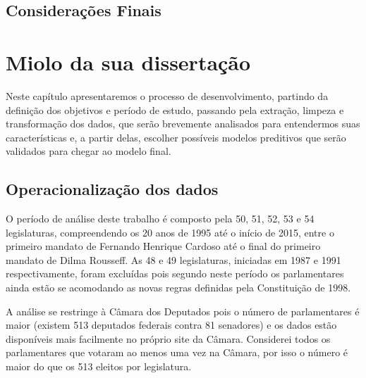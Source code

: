 \documentclass[a4paper,titlepage]{ppgi}\usepackage[]{graphicx}\usepackage[]{color}
\makeatletter
\newenvironment{kframe}{%
 \def\at@end@of@kframe{}%
 \ifinner\ifhmode%
  \def\at@end@of@kframe{\end{minipage}}%
  \begin{minipage}{\columnwidth}%
 \fi\fi%
 \def\FrameCommand##1{\hskip\@totalleftmargin \hskip-\fboxsep
 \colorbox{shadecolor}{##1}\hskip-\fboxsep
     \hskip-\linewidth \hskip-\@totalleftmargin \hskip\columnwidth}%
 \MakeFramed {\advance\hsize-\width
   \@totalleftmargin\z@ \linewidth\hsize
   \@setminipage}}%
 {\par\unskip\endMakeFramed%
 \at@end@of@kframe}
\newenvironment{knitrout}{}{} %
\makeatother
\begin{document}
\section{Considerações Finais}


\begin{knitrout}
\color{fgcolor}\begin{kframe}


{\ttfamily\noindent\bfseries\color{errorcolor}{\#\# Error in `[<-.data.frame`(`*tmp*`, data[, column] == "{}"{}, column, value = NA): missing values are not allowed in subscripted assignments of data frames}}\end{kframe}
\end{knitrout}

\chapter{Miolo da sua dissertação}\label{cap:miolo}

Neste capítulo apresentaremos o processo de desenvolvimento, partindo da
definição dos objetivos e período de estudo, passando pela extração, limpeza e
transformação dos dados, que serão brevemente analisados para entendermos suas
características e, a partir delas, escolher possíveis modelos preditivos que
serão validados para chegar ao modelo final.

\section{Operacionalização dos dados}


O período de análise deste trabalho é composto pela 50\textordfeminine{},
51\textordfeminine{}, 52\textordfeminine{}, 53\textordfeminine{} e
54\textordfeminine{} legislaturas, compreendendo os 20 anos de 1995 até o
início de 2015, entre o primeiro mandato de Fernando Henrique Cardoso até o
final do primeiro mandato de Dilma Rousseff. As 48\textordfeminine{} e
49\textordfeminine{} legislaturas, iniciadas em 1987 e 1991 respectivamente,
foram excluídas pois segundo  neste período os
parlamentares ainda estão se acomodando as novas regras definidas pela
Constituição de 1998.


A análise se restringe à Câmara dos Deputados pois o número de parlamentares é
maior (existem 513 deputados federais contra 81 senadores) e os dados estão
disponíveis mais facilmente no próprio site da Câmara. Considerei todos os
parlamentares que votaram ao menos uma vez na Câmara, por isso o número é maior
do que os 513 eleitos por legislatura.
\end{document}
